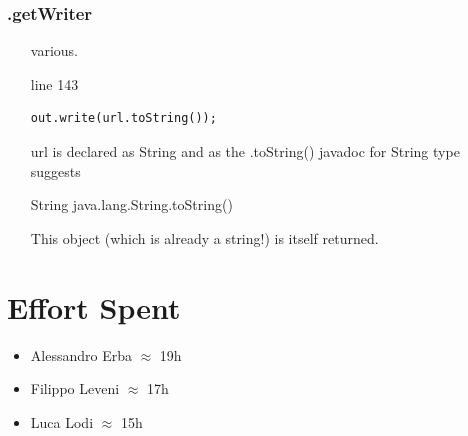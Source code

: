 \documentclass[english]{article}
\begin{document}
\subsubsection*{.getWriter}
\begin{itemize}
 \item[various.]{line 143
		\begin{lstlisting} 
out.write(url.toString());
		\end{lstlisting}
		url is declared as String and as the .toString() javadoc for String type suggests 
\begin{displayquote}
		String java.lang.String.toString()

This object (which is already a string!) is itself returned.
\end{displayquote}}
\end{itemize}





\clearpage
\section{Effort Spent} %
	\begin{itemize}
		\item Alessandro Erba $\approx$ 19h
		\item Filippo Leveni 	$\approx$ 17h
		\item Luca Lodi $\approx$ 15h
	\end{itemize}
\end{document}
